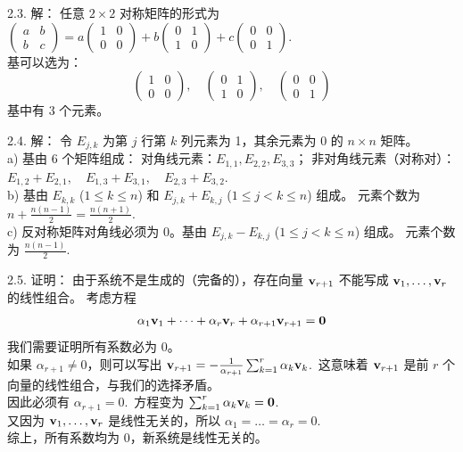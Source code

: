 \begin{exer}
2.3. 解：
任意 $2 \times 2$ 对称矩阵的形式为 $\begin{pmatrix} a & b \\ b & c \end{pmatrix} = a\begin{pmatrix} 1 & 0 \\ 0 & 0 \end{pmatrix} + b\begin{pmatrix} 0 & 1 \\ 1 & 0 \end{pmatrix} + c\begin{pmatrix} 0 & 0 \\ 0 & 1 \end{pmatrix}$.~
\\
基可以选为：
$$
\begin{pmatrix} 1 & 0 \\ 0 & 0 \end{pmatrix}, \quad
\begin{pmatrix} 0 & 1 \\ 1 & 0 \end{pmatrix}, \quad
\begin{pmatrix} 0 & 0 \\ 0 & 1 \end{pmatrix}
$$
基中有 3 个元素。

2.4. 解：
令 $E_{j,k}$ 为第 $j$ 行第 $k$ 列元素为 1，其余元素为 0 的 $n \times n$ 矩阵。
\\
a) 基由 6 个矩阵组成：
对角线元素：$E_{1,1}, E_{2,2}, E_{3,3}$；
非对角线元素（对称对）：$E_{1,2}+E_{2,1}, \quad E_{1,3}+E_{3,1}, \quad E_{2,3}+E_{3,2}$.~
\\
b) 基由 $E_{k,k}$ ($1 \le k \le n$) 和 $E_{j,k} + E_{k,j}$ ($1 \le j < k \le n$) 组成。
元素个数为 $n + \frac{n(n-1)}{2} = \frac{n(n+1)}{2}$.~
\\
c) 反对称矩阵对角线必须为 0。基由 $E_{j,k} - E_{k,j}$ ($1 \le j < k \le n$) 组成。
元素个数为 $\frac{n(n-1)}{2}$.~

2.5. 证明：
由于系统不是生成的（完备的），存在向量 $\mathbf{v}_{r+1}$ 不能写成 $\mathbf{v}_1, \dots, \mathbf{v}_r$ 的线性组合。
考虑方程
$$ \alpha_1 \mathbf{v}_1 + \dots + \alpha_r \mathbf{v}_r + \alpha_{r+1} \mathbf{v}_{r+1} = \mathbf{0} $$
我们需要证明所有系数必为 0。
\\
如果 $\alpha_{r+1} \neq 0$，则可以写出 $\mathbf{v}_{r+1} = -\frac{1}{\alpha_{r+1}} \sum_{k=1}^r \alpha_k \mathbf{v}_k$.~这意味着 $\mathbf{v}_{r+1}$ 是前 $r$ 个向量的线性组合，与我们的选择矛盾。
\\
因此必须有 $\alpha_{r+1} = 0$.~方程变为 $\sum_{k=1}^r \alpha_k \mathbf{v}_k = \mathbf{0}$.~
\\
又因为 $\mathbf{v}_1, \dots, \mathbf{v}_r$ 是线性无关的，所以 $\alpha_1 = \dots = \alpha_r = 0$.~
\\
综上，所有系数均为 0，新系统是线性无关的。


\end{exer}
